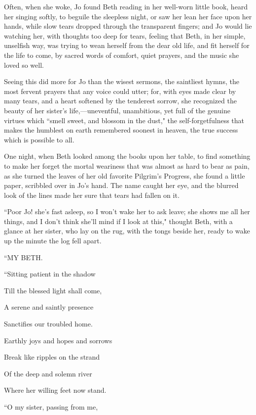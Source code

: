 Often, when she woke, Jo found Beth reading in her well-worn little
book, heard her singing softly, to beguile the sleepless night, or saw
her lean her face upon her hands, while slow tears dropped through the
transparent fingers; and Jo would lie watching her, with thoughts too
deep for tears, feeling that Beth, in her simple, unselfish way, was
trying to wean herself from the dear old life, and fit herself for the
life to come, by sacred words of comfort, quiet prayers, and the music
she loved so well.

Seeing this did more for Jo than the wisest sermons, the saintliest
hymns, the most fervent prayers that any voice could utter; for, with
eyes made clear by many tears, and a heart softened by the tenderest
sorrow, she recognized the beauty of her sister's
life,---uneventful, unambitious, yet full of the genuine virtues which
``smell sweet, and blossom in the dust," the self-forgetfulness that
makes the humblest on earth remembered soonest in heaven, the true
success which is possible to all.

One night, when Beth looked among the books upon her table, to find
something to make her forget the mortal weariness that was almost as
hard to bear as pain, as she turned the leaves of her old favorite
Pilgrim's Progress, she found a little paper, scribbled
over in Jo's hand. The name caught her eye, and the
blurred look of the lines made her sure that tears had fallen on it.

``Poor Jo! she's fast asleep, so I won't
wake her to ask leave; she shows me all her things, and I
don't think she'll mind if I look at
this," thought Beth, with a glance at her sister, who lay on the rug,
with the tongs beside her, ready to wake up the minute the log fell
apart.

\hfill\break

``MY BETH.

``Sitting patient in the shadow

Till the blessed light shall come,

A serene and saintly presence

Sanctifies our troubled home.

Earthly joys and hopes and sorrows

Break like ripples on the strand

Of the deep and solemn river

Where her willing feet now stand.

\hfill\break

``O my sister, passing from me,

